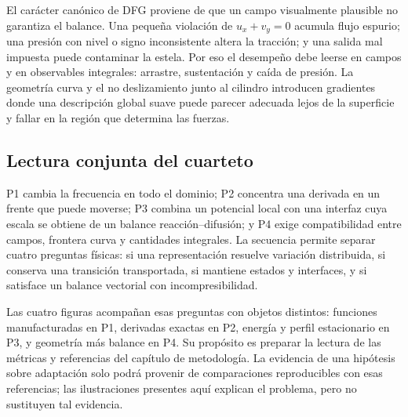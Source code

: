 El carácter canónico de DFG proviene de que un campo visualmente plausible no
garantiza el balance. Una pequeña violación de $u_x+v_y=0$ acumula flujo
espurio; una presión con nivel o signo inconsistente altera la tracción; y
una salida mal impuesta puede contaminar la estela. Por eso el desempeño debe
leerse en campos y en observables integrales: arrastre, sustentación y caída
de presión. La geometría curva y el no deslizamiento junto al cilindro
introducen gradientes donde una descripción global suave puede parecer
adecuada lejos de la superficie y fallar en la región que determina las
fuerzas.

\subsection{Lectura conjunta del cuarteto}

P1 cambia la frecuencia en todo el dominio; P2 concentra una derivada en un
frente que puede moverse; P3 combina un potencial local con una interfaz cuya
escala se obtiene de un balance reacción--difusión; y P4 exige compatibilidad
entre campos, frontera curva y cantidades integrales. La secuencia permite
separar cuatro preguntas físicas: si una representación resuelve variación
distribuida, si conserva una transición transportada, si mantiene estados y
interfaces, y si satisface un balance vectorial con incompresibilidad.

Las cuatro figuras acompañan esas preguntas con objetos distintos: funciones
manufacturadas en P1, derivadas exactas en P2, energía y perfil estacionario
en P3, y geometría más balance en P4. Su propósito es preparar la lectura de
las métricas y referencias del capítulo de metodología. La evidencia de una
hipótesis sobre adaptación solo podrá provenir de comparaciones reproducibles
con esas referencias; las ilustraciones presentes aquí explican el problema,
pero no sustituyen tal evidencia.
